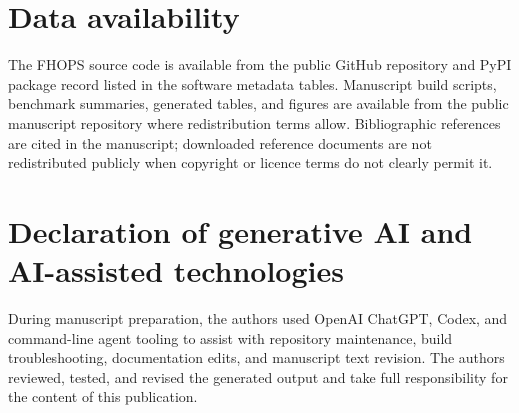 \section*{Data availability}

The FHOPS source code is available from the public GitHub repository and PyPI package record listed in the software metadata tables. Manuscript build scripts, benchmark summaries, generated tables, and figures are available from the public manuscript repository where redistribution terms allow. Bibliographic references are cited in the manuscript; downloaded reference documents are not redistributed publicly when copyright or licence terms do not clearly permit it.

\section*{Declaration of generative AI and AI-assisted technologies}

During manuscript preparation, the authors used OpenAI ChatGPT, Codex, and command-line agent tooling to assist with repository maintenance, build troubleshooting, documentation edits, and manuscript text revision. The authors reviewed, tested, and revised the generated output and take full responsibility for the content of this publication.
